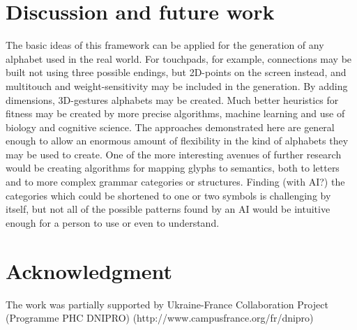 \documentclass[conference]{IEEEtran}
\begin{document}
 \section{Discussion and future work}
 The basic ideas of this framework can be applied for the generation of any alphabet used in the real world. For touchpads, for example, connections may be built not using three possible endings, but 2D-points on the screen instead, and multitouch and weight-sensitivity may be included in the generation. By adding dimensions, 3D-gestures alphabets may be created. Much better heuristics for fitness may be created by more precise algorithms, machine learning and use of biology and cognitive science. The approaches demonstrated here are general enough to allow an enormous amount of flexibility in the kind of alphabets they may be used to create.
One of the more interesting avenues of further research would be creating algorithms for mapping glyphs to semantics, both to letters and to more complex grammar categories or structures. Finding (with AI?) the categories which could be shortened to one or two symbols is challenging by itself, but not all of the possible patterns found by an AI would be intuitive enough for a person to use or even to understand. 

\section*{Acknowledgment}
The work was partially supported by Ukraine-France Collaboration Project (Programme PHC DNIPRO) (http://www.campusfrance.org/fr/dnipro)



\end{document}
